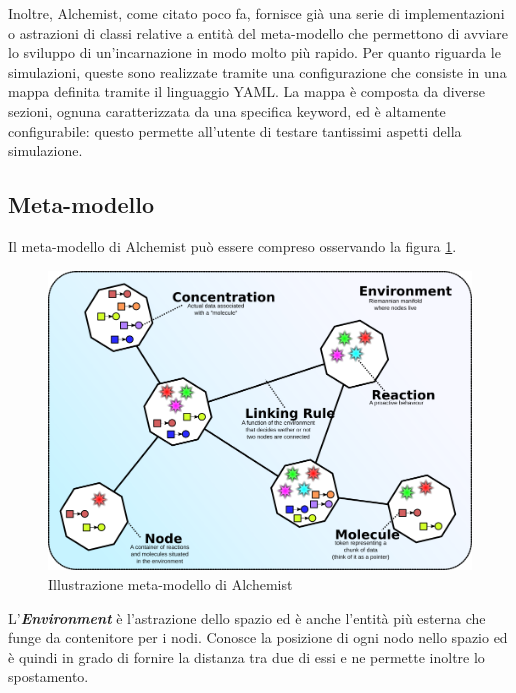 Inoltre, Alchemist, come citato poco fa, fornisce già una serie di implementazioni o astrazioni di classi relative a entità del meta-modello che permettono di avviare lo sviluppo di un'incarnazione in modo molto più rapido.
Per quanto riguarda le simulazioni, queste sono realizzate tramite una configurazione che consiste in una mappa definita tramite il linguaggio YAML. La mappa è composta da diverse sezioni, ognuna caratterizzata da una specifica keyword, ed è altamente configurabile: questo permette all'utente di testare tantissimi aspetti della simulazione.

\subsection{Meta-modello}
Il meta-modello di Alchemist può essere compreso osservando la figura \ref{fig:alchemistModel}.
\begin{figure} %
\begin{center} %
\includegraphics[width=12.5cm]{images/AlchemistModel.png} %
\caption[Illustrazione meta-modello di Alchemist]{Illustrazione meta-modello di Alchemist} \label{fig:alchemistModel}
\end{center}
\end{figure}

L'\textbf{\textit{Environment}} è l'astrazione dello spazio ed è anche l'entità più esterna che funge da contenitore per i nodi. Conosce la posizione di ogni nodo nello spazio ed è quindi in grado di fornire la distanza tra due di essi e ne permette inoltre lo spostamento.

